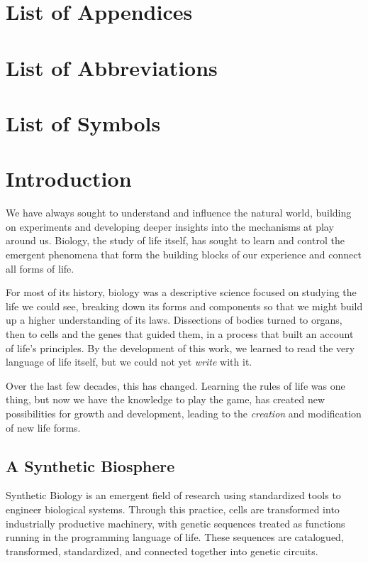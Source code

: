 \documentclass[12pt,a4paper]{article}
\begin{document}
	\section{List of Appendices}
	\newpage
	
	\section{List of Abbreviations}
	\newpage
	
	\section{List of Symbols}
	\newpage
	
	
	\section{Introduction}

	We have always sought to understand and influence the natural world, building on experiments and developing deeper insights into the mechanisms at play around us. Biology, the study of life itself, has sought to learn and control the emergent phenomena that form the building blocks of our experience and connect all forms of life.
	
	For most of its history, biology was a descriptive science focused on studying the life we could see, breaking down its forms and components so that we might build up a higher understanding of its laws. Dissections of bodies turned to organs, then to cells and the genes that guided them, in a process that built an account of life's principles. By the development of this work, we learned to read the very language of life itself, but we could not yet \textit{write} with it.
	
	Over the last few decades, this has changed. Learning the rules of life was one thing, but now we have the knowledge to play the game, 
	has created new possibilities for growth and development, leading to the \textit{creation} and modification of new life forms.
	
	
	\subsection{A Synthetic Biosphere}
	
	Synthetic Biology is an emergent field of research using standardized tools to engineer biological systems. Through this practice, cells are transformed into industrially productive machinery, with genetic sequences treated as functions running in the programming language of life. These sequences are catalogued, transformed, standardized, and connected together into genetic circuits.
	
\end{document}
